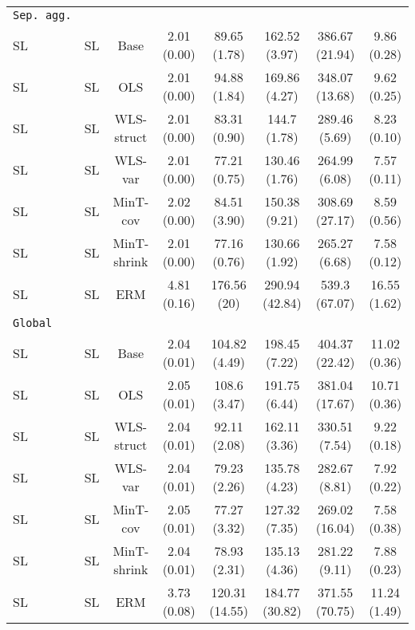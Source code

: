 \documentclass[preprint, 3p, times, twocolumn]{elsarticle}
\begin{document}
\begin{table*}[t]
\begin{center}
\begin{tabular}{l c  cccccc}
  \midrule				
  \texttt{Sep.~agg.}									\\					
  \hspace{0.1cm} 	SL	&SL	&Base	&2.01 (0.00)	&89.65 (1.78)	&162.52 (3.97)	&386.67 (21.94)	&9.86 (0.28)	\\
  \hspace{0.1cm} 	SL	&SL	&OLS	&2.01 (0.00)	&94.88 (1.84)	&169.86 (4.27)	&348.07 (13.68)	&9.62 (0.25)	\\
  \hspace{0.1cm} 	SL	&SL	&WLS-struct	&2.01 (0.00)	&83.31 (0.90)	&144.7 (1.78)	&289.46 (5.69)	&8.23 (0.10)	\\
  \hspace{0.1cm} 	SL	&SL	&WLS-var	&2.01 (0.00)	&77.21 (0.75)	&130.46 (1.76)	&264.99 (6.08)	&7.57 (0.11)	\\
  \hspace{0.1cm} 	SL	&SL	&MinT-cov	&2.02 (0.00)	&84.51 (3.90)	&150.38 (9.21)	&308.69 (27.17)	&8.59 (0.56)	\\
  \hspace{0.1cm} 	SL	&SL	&MinT-shrink	&2.01 (0.00)	&77.16 (0.76)	&130.66 (1.92)	&265.27 (6.68)	&7.58 (0.12)	\\
  \hspace{0.1cm} 	SL	&SL	&ERM	&4.81 (0.16)	&176.56 (20)	&290.94 (42.84)	&539.3 (67.07)	&16.55 (1.62)	\\
  \midrule									
  \texttt{Global}									\\
  \hspace{0.1cm} 	SL	&SL	&Base	&2.04 (0.01)	&104.82 (4.49)	&198.45 (7.22)	&404.37 (22.42)	&11.02 (0.36)	\\
  \hspace{0.1cm} 	SL	&SL	&OLS	&2.05 (0.01)	&108.6 (3.47)	&191.75 (6.44)	&381.04 (17.67)	&10.71 (0.36)	\\
  \hspace{0.1cm} 	SL	&SL	&WLS-struct	&2.04 (0.01)	&92.11 (2.08)	&162.11 (3.36)	&330.51 (7.54)	&9.22 (0.18)	\\
  \hspace{0.1cm} 	SL	&SL	&WLS-var	&2.04 (0.01)	&79.23 (2.26)	&135.78 (4.23)	&282.67 (8.81)	&7.92 (0.22)	\\
  \hspace{0.1cm} 	SL	&SL	&MinT-cov	&2.05 (0.01)	&77.27 (3.32)	&127.32 (7.35)	&269.02 (16.04)	&7.58 (0.38)	\\
  \hspace{0.1cm} 	SL	&SL	&MinT-shrink	&2.04 (0.01)	&78.93 (2.31)	&135.13 (4.36)	&281.22 (9.11)	&7.88 (0.23)	\\
  \hspace{0.1cm} 	SL	&SL	&ERM	&3.73 (0.08)	&120.31 (14.55)	&184.77 (30.82)	&371.55 (70.75)	&11.24 (1.49)	\\  
  \bottomrule
  \end{tabular}
  \end{center}
  \end{table*}
\end{document}
